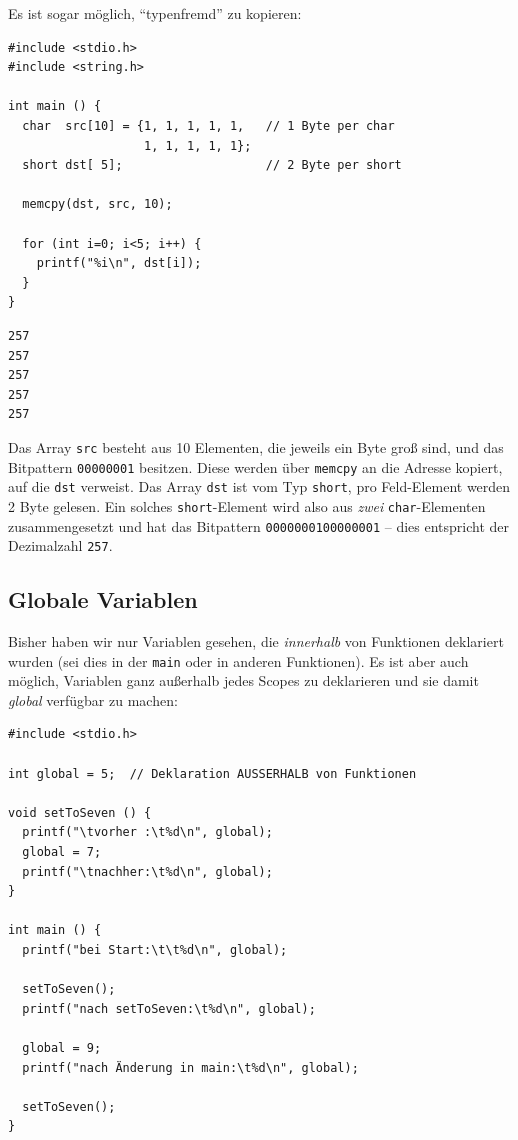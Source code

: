 Es ist sogar möglich, \enquote{typenfremd} zu kopieren:

\begin{codebox}
\begin{verbatim}
#include <stdio.h>
#include <string.h>

int main () {
  char  src[10] = {1, 1, 1, 1, 1,   // 1 Byte per char
                   1, 1, 1, 1, 1};
  short dst[ 5];                    // 2 Byte per short

  memcpy(dst, src, 10);

  for (int i=0; i<5; i++) {
    printf("%i\n", dst[i]);
  }
}
\end{verbatim}
\end{codebox}

\begin{cmdbox}
\begin{verbatim}
257
257
257
257
257
\end{verbatim}
\end{cmdbox}

Das Array \texttt{src} besteht aus 10 Elementen, die jeweils ein Byte groß sind, und das Bitpattern \texttt{00000001} besitzen. Diese werden über \texttt{memcpy} an die Adresse kopiert, auf die \texttt{dst} verweist. Das Array \texttt{dst} ist vom Typ \texttt{short}, \ie pro Feld-Element werden 2 Byte gelesen. Ein solches \texttt{short}-Element wird also aus \emph{zwei} \texttt{char}-Elementen zusammengesetzt und hat das Bitpattern \texttt{0000000100000001} -- dies entspricht der Dezimalzahl \texttt{257}.

\subsection{Globale Variablen} \label{sec:globals}
Bisher haben wir nur Variablen gesehen, die \emph{innerhalb} von Funktionen deklariert wurden (sei dies in der \texttt{main} oder in anderen Funktionen). Es ist aber auch möglich, Variablen ganz außerhalb jedes Scopes zu deklarieren und sie damit \emph{global} verfügbar zu machen:

\begin{codebox}
\begin{verbatim}
#include <stdio.h>

int global = 5;  // Deklaration AUSSERHALB von Funktionen

void setToSeven () {
  printf("\tvorher :\t%d\n", global);
  global = 7;
  printf("\tnachher:\t%d\n", global);
}

int main () {
  printf("bei Start:\t\t%d\n", global);

  setToSeven();
  printf("nach setToSeven:\t%d\n", global);

  global = 9;
  printf("nach Änderung in main:\t%d\n", global);

  setToSeven();
}
\end{verbatim}
\end{codebox}

